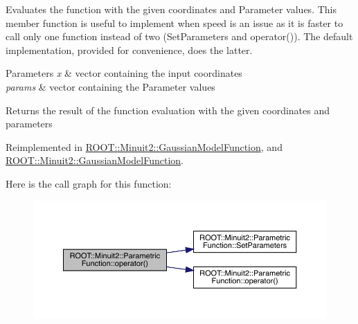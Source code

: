 Evaluates the function with the given coordinates and Parameter values. This member function is useful to implement when speed is an issue as it is faster to call only one function instead of two (Set\+Parameters and operator()). The default implementation, provided for convenience, does the latter.


\begin{DoxyParams}{Parameters}
{\em x} & vector containing the input coordinates\\
\hline
{\em params} & vector containing the Parameter values\\
\hline
\end{DoxyParams}
\begin{DoxyReturn}{Returns}
the result of the function evaluation with the given coordinates and parameters 
\end{DoxyReturn}


Reimplemented in \mbox{\hyperlink{classROOT_1_1Minuit2_1_1GaussianModelFunction_ab74ced8f50ef3831c8142de54877e726}{R\+O\+O\+T\+::\+Minuit2\+::\+Gaussian\+Model\+Function}}, and \mbox{\hyperlink{classROOT_1_1Minuit2_1_1GaussianModelFunction_ab74ced8f50ef3831c8142de54877e726}{R\+O\+O\+T\+::\+Minuit2\+::\+Gaussian\+Model\+Function}}.

Here is the call graph for this function\+:
\nopagebreak
\begin{figure}[H]
\begin{center}
\leavevmode
\includegraphics[width=350pt]{d3/d76/classROOT_1_1Minuit2_1_1ParametricFunction_a5fab6e804e0f93bd593580f582b0f7c5_cgraph}
\end{center}
\end{figure}
\mbox{\label{classROOT_1_1Minuit2_1_1ParametricFunction_a5fab6e804e0f93bd593580f582b0f7c5}} 
